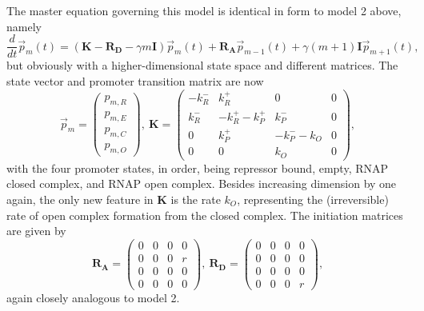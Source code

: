 \documentclass[12pt]{article}%
\newcommand{\vect}[1]{\vec{#1}}
\newcommand{\matr}[1]{\mathbf{#1}}
\newcommand{\deriv}[2][{}]{\frac{d #1}{d #2}}
\begin{document}
The master equation governing this model is
identical in form to model 2 above, namely
\begin{equation}
\deriv{t}\vect{p}_m(t) =
\left( \matr{K} - \matr{R_D} - \gamma m \matr{I} \right) \vect{p}_m(t)
                + \matr{R_A} \vect{p}_{m-1}(t) +
                \gamma (m+1) \matr{I} \vect{p}_{m+1}(t),
\end{equation}
but obviously with a higher-dimensional state space and different matrices.
The state vector and promoter transition matrix are now
\begin{equation}
\vect{p}_m = \begin{pmatrix} p_{m,R} \\ p_{m,E} \\
                             p_{m,C} \\ p_{m,O}\end{pmatrix},\
\matr{K} = \begin{pmatrix} -k_R^- & k_R^+ & 0 & 0\\
                        k_R^- & -k_R^+ -k_P^+ & k_P^- & 0 \\
                        0 & k_P^+ & -k_P^- - k_O & 0 \\
                        0 & 0 & k_O & 0
                \end{pmatrix},
\end{equation}
with the four promoter states, in order, being repressor bound,
empty, RNAP closed complex, and RNAP open complex.
Besides increasing dimension by one again, the only new feature in
$\matr{K}$ is the rate $k_O$, representing the (irreversible)
rate of open complex formation from the closed complex.
The initiation matrices are given by
\begin{equation}
\matr{R_A} = \begin{pmatrix}
        0 & 0 & 0 & 0 \\ 0 & 0 & 0 & r \\ 0 & 0 & 0 & 0\\ 0 & 0 & 0 & 0
                \end{pmatrix},\
\matr{R_D} = \begin{pmatrix}
        0 & 0 & 0 & 0 \\ 0 & 0 & 0 & 0 \\ 0 & 0 & 0 & 0\\ 0 & 0 & 0 & r
                \end{pmatrix},
\end{equation}
again closely analogous to model 2.
\end{document}

